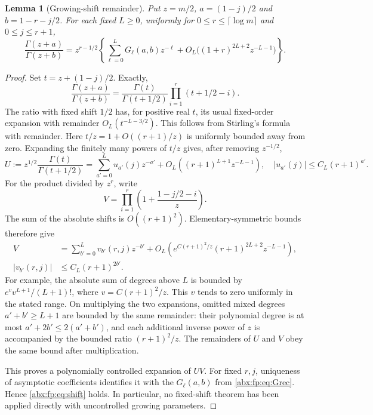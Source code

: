 \documentclass[11pt,letterpaper]{article}
\numberwithin{equation}{section}
\newtheorem{lemma}[theorem]{Lemma}
\theoremstyle{remark}\newtheorem{remark}[theorem]{Remark}
\begin{document}
\begin{lemma}[Growing-shift remainder]\label{abx:fp:lem:shift}
Put $z=m/2$, $a=(1-j)/2$ and $b=1-r-j/2$. For each fixed
$L\ge0$, uniformly for $0\le r\le\lceil\log m\rceil$ and
$0\le j\le r+1$,
\begin{equation}\label{abx:fp:eq:shift}
 \frac{\Gamma(z+a)}{\Gamma(z+b)}
 =z^{r-1/2}\left\{\sum_{\ell=0}^L G_\ell(a,b)z^{-\ell}
    +O_L\bigl((1+r)^{2L+2}z^{-L-1}\bigr)\right\}.
\end{equation}
\end{lemma}
\begin{proof}
Set $t=z+(1-j)/2$. Exactly,
\[
 \frac{\Gamma(z+a)}{\Gamma(z+b)}
 =\frac{\Gamma(t)}{\Gamma(t+1/2)}
        \prod_{i=1}^r(t+1/2-i).
\]
The ratio with fixed shift $1/2$ has, for positive real $t$, its usual
fixed-order expansion with remainder $O_L(t^{-L-3/2})$. This follows
from Stirling's formula with remainder\cite{dlmf}. Here
$t/z=1+O((r+1)/z)$ is uniformly bounded away from zero. Expanding the
finitely many powers of $t/z$ gives, after removing $z^{-1/2}$,
\[
 U:=z^{1/2}\frac{\Gamma(t)}{\Gamma(t+1/2)}
   =\sum_{a'=0}^L u_{a'}(j)z^{-a'}
      +O_L((r+1)^{L+1}z^{-L-1}),
 \quad |u_{a'}(j)|\le C_L(r+1)^{a'}.
\]
For the product divided by $z^r$, write
\[
 V=\prod_{i=1}^r\left(1+\frac{1-j/2-i}{z}\right).
\]
The sum of the absolute shifts is $O((r+1)^2)$. Elementary-symmetric
bounds therefore give
\begin{align*}
 V&=\sum_{b'=0}^L v_{b'}(r,j)z^{-b'}
 +O_L\!\left(e^{C(r+1)^2/z}(r+1)^{2L+2}z^{-L-1}\right),\\
 |v_{b'}(r,j)|&\le C_L(r+1)^{2b'}.
\end{align*}
For example, the absolute sum of degrees above $L$ is bounded by
$e^v v^{L+1}/(L+1)!$, where $v=C(r+1)^2/z$. This $v$ tends to zero
uniformly in the stated range. On multiplying the two expansions,
omitted mixed degrees $a'+b'\ge L+1$ are bounded by the same
remainder: their polynomial degree is at most
$a'+2b'\le2(a'+b')$, and each additional inverse power of $z$ is
accompanied by the bounded ratio $(r+1)^2/z$. The remainders of $U$
and $V$ obey the same bound after multiplication.

This proves a polynomially controlled expansion of $UV$. For fixed
$r,j$, uniqueness of asymptotic coefficients identifies it with the
$G_\ell(a,b)$ from \eqref{abx:fp:eq:Grec}. Hence \eqref{abx:fp:eq:shift} holds.
In particular, no fixed-shift theorem has been applied directly with
uncontrolled growing parameters.
\end{proof}
\end{document}
